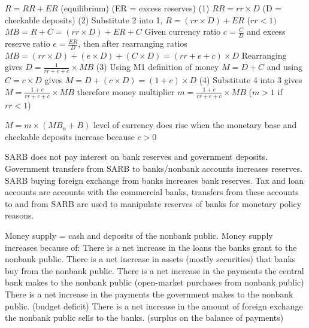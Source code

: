 \documentclass[12pt]{examnotes}
\begin{document}
\ra  $R = RR + ER $ (equilibrium) (ER = excess reserves) (1)
\vspace{6pt}
\ra  $RR = rr \times D$ \quad (D = checkable deposits) (2)
\vspace{6pt}
\ra  Substitute 2 into 1, $R = (rr \times D) + ER$ ($rr < 1)$
\vspace{6pt}
\ra  $MB = R + C = (rr \times D) + ER + C$
\vspace{6pt}
\ra  Given currency ratio $c=\frac{C}{D}$ and excess reserve ratio $e=\frac{ER}{D}$, then after rearranging ratios $MB = (rr \times D) + (e \times D) + (C \times D) = (rr + e + c) \times D$
\vspace{6pt}
\ra Rearranging gives $D=\displaystyle\frac{1}{rr + e + c} \times MB$ (3)
\vspace{6pt}
\ra Using M1 definition of money $M=D+C$ and using $C = c \times D$ gives $M=D + (c \times D)=(1+c) \times D$ (4)
\vspace{6pt}
\ra Substitute 4 into 3 gives $M=\displaystyle\frac{1+c}{rr + e + c} \times MB$ 
\vspace{6pt}
\ra therefore money multiplier $m=\displaystyle\frac{1+c}{rr + e + c} \times MB$ \quad  ($m > 1$ if $rr < 1$)

\ra $M= m \times (MB_n + B)$
\ra level of currency does rise when the monetary base and checkable deposits increase because $c > 0$ 

\ra SARB does not pay interest on bank reserves and government deposits.
\ra Government transfers from SARB to banks/nonbank accounts increases reserves. 
\ra SARB buying foreign exchange from banks increases bank reserves.
\ra Tax and loan accounts are accounts with the commercial banks, transfers from these accounts to and from SARB are used to manipulate reserves of banks for monetary policy reasons.

\ra Money supply = cash and deposits of the nonbank public.
\ra Money supply increases because of:
 There is a net increase in the loans the banks grant to the nonbank public.
 There is a net increase in assets (mostly securities) that banks buy from the nonbank public.
 There is a net increase in the payments the central bank makes to the nonbank public (open-market purchases from nonbank public)
 There is a net increase in the payments the government makes to the nonbank public. (budget deficit)
 There is a net increase in the amount of foreign exchange the nonbank public sells to the banks. (surplus on the balance of payments)
\end{document}
